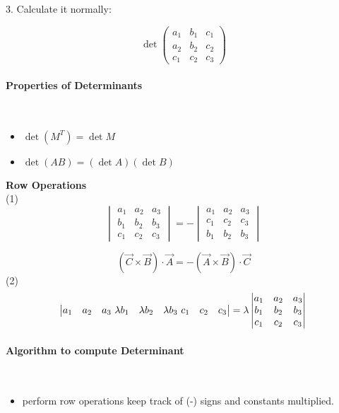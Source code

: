 \documentclass[svgnames]{article}   	%
\begin{document}
3. Calculate it normally: 

\[
\det \begin{pmatrix} 
a_1 & b_1 & c_1 \\
a_2 & b_2 & c_2 \\
c_1 & c_2 & c_3 
\end{pmatrix} 
\] \vspace{5px}

\paragraph{Properties of Determinants} \mbox{} \\

\begin{itemize}
  \item $\det(M^T) = \det M$
  \item $\det (AB) = (\det A)(\det B)$
\end{itemize}
\vspace{5px}
\textbf{Row Operations} \mbox{} \\
(1) \\
\[
\begin{vmatrix} 
a_1 & a_2 & a_3 \\ 
b_1 & b_2 & b_3 \\
c_1 & c_2 & c_3 
\end{vmatrix}  = 
- \begin{vmatrix} 
a_1 & a_2 & a_3 \\ 
c_1 & c_2 & c_3 \\
b_1 & b_2 & b_3 
\end{vmatrix} 
\] \vspace{5px} 

\[
  (\vec{C} \times \vec{B}) \cdot \vec{A} = - (\vec{A} \times \vec{B} ) \cdot
  \vec{C}
\] \vspace{5px} 
(2) \\
\[
\begin{vmatrix} 
a_1 & a_2 & a_3 \ 
\lambda b_1 & \lambda b_2 & \lambda b_3 \ 
c_1 & c_2 & c_3 
\end{vmatrix} = \lambda \begin{vmatrix} 
a_1 & a_2 & a_3 \\
b_1 & b_2 & b_3 \\
c_1 & c_2 & c_3 
\end{vmatrix} \mbox{} \\
\] \vspace{5px} 


\paragraph{Algorithm to compute Determinant} \mbox{} \\

\begin{itemize}
  \item perform row operations keep track of (-) signs and constants
    multiplied. 
\end{itemize}
\end{document}
